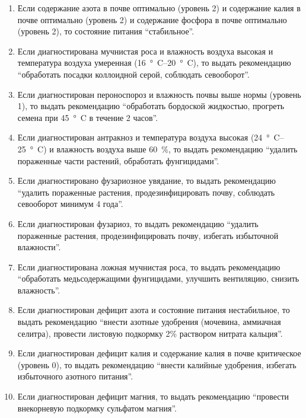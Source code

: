 \begin{enumerate}
    \item Если содержание азота в почве оптимально (уровень 2) и содержание калия в почве оптимально (уровень 2) и содержание фосфора в почве оптимально (уровень 2), то состояние питания \enquote{стабильное}.

    \item Если диагностирована мучнистая роса и влажность воздуха высокая и температура воздуха умеренная (\SIrange{16}{20}{\degree C}), то выдать рекомендацию \enquote{обработать посадки коллоидной серой, соблюдать севооборот}.

    \item Если диагностирован пероноспороз и влажность почвы выше нормы (уровень 1), то выдать рекомендацию \enquote{обработать бордоской жидкостью, прогреть семена при \SI{45}{\degree C} в течение 2 часов}.

    \item Если диагностирован антракноз и температура воздуха высокая (\SIrange{24}{25}{\degree C}) и влажность воздуха выше \SI{60}{\percent}, то выдать рекомендацию \enquote{удалить пораженные части растений, обработать фунгицидами}.

    \item Если диагностировано фузариозное увядание, то выдать рекомендацию \enquote{удалить пораженные растения, продезинфицировать почву, соблюдать севооборот минимум 4 года}.

    \item Если диагностирован фузариоз, то выдать рекомендацию \enquote{удалить пораженные растения, продезинфицировать почву, избегать избыточной влажности}.

    \item Если диагностирована ложная мучнистая роса, то выдать рекомендацию \enquote{обработать медьсодержащими фунгицидами, улучшить вентиляцию, снизить влажность}.

    \item Если диагностирован дефицит азота и состояние питания нестабильное, то выдать рекомендацию \enquote{внести азотные удобрения (мочевина, аммиачная селитра), провести листовую подкормку 2\% раствором нитрата кальция}.

    \item Если диагностирован дефицит калия и содержание калия в почве критическое (уровень 0), то выдать рекомендацию \enquote{внести калийные удобрения, избегать избыточного азотного питания}.

    \item Если диагностирован дефицит магния, то выдать рекомендацию \enquote{провести внекорневую подкормку сульфатом магния}.


\end{enumerate}
